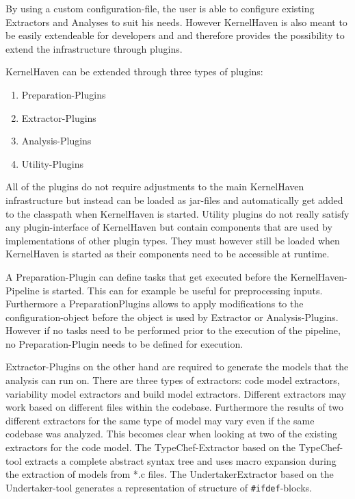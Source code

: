 \documentclass[a4paper]{article}
\begin{document}
By using a custom configuration-file, the user is able to configure existing Extractors and Analyses to suit his needs. However KernelHaven is also meant to be easily extendeable for developers and and therefore provides the possibility to extend the infrastructure through plugins.

KernelHaven can be extended through three types of plugins:

\begin{enumerate}
    \item Preparation-Plugins
	\item Extractor-Plugins
	\item Analysis-Plugins
	\item Utility-Plugins
\end{enumerate}

All of the plugins do not require adjustments to the main KernelHaven infrastructure but instead can be loaded as jar-files and automatically get added to the classpath when KernelHaven is started. Utility plugins do not really satisfy any plugin-interface of KernelHaven but contain components that are used by implementations of other plugin types. They must however still be loaded when KernelHaven is started as their components need to be accessible at runtime.

A Preparation-Plugin can define tasks that get executed before the KernelHaven-Pipeline is started. This can for example be useful for preprocessing inputs. Furthermore a PreparationPlugins allows to apply modifications to the configuration-object before the object is used by Extractor or Analysis-Plugins. However if no tasks need to be performed prior to the execution of the pipeline, no Preparation-Plugin needs to be defined for execution. 

Extractor-Plugins on the other hand are required to generate the models that the analysis can run on. There are three types of extractors: code model extractors, variability model extractors and build model extractors. Different extractors may work based on different files within the codebase. Furthermore the results of two different extractors for the same type of model may vary even if the same codebase was analyzed. This becomes clear when looking at two of the existing extractors for the code model. The TypeChef-Extractor based on the TypeChef-tool \cite{Kenner:2010:TTT:1868688.1868693} extracts a complete abstract syntax tree and uses macro expansion during the extraction of models from *.c files. The UndertakerExtractor based on the Undertaker-tool \cite{Tartler:2011:FCC:1966445.1966451} generates a representation of structure of \texttt{\#ifdef}-blocks.
\end{document}
